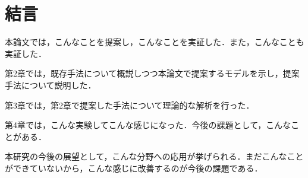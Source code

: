 \chapter{結言}

本論文では，こんなことを提案し，こんなことを実証した．また，こんなことも実証した．

第2章では，既存手法について概説しつつ本論文で提案するモデルを示し，提案手法について説明した．

第3章では，第2章で提案した手法について理論的な解析を行った．

第4章では，こんな実験してこんな感じになった．今後の課題として，こんなことがある．

本研究の今後の展望として，こんな分野への応用が挙げられる．まだこんなことができていないから，こんな感じに改善するのが今後の課題である．
